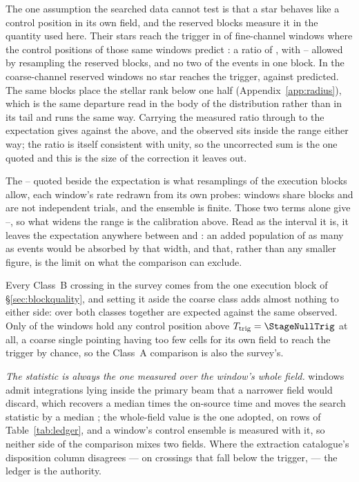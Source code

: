 The one assumption the searched data cannot test is that a star behaves like
a control position in its own field, and the reserved blocks measure it in
the quantity used here. Their stars reach the trigger in \StHoObs{} of
\StHoNFine{} fine-channel windows where the control positions of those same
windows predict \StHoExpFine: a ratio of \StHoRatio, with \StHoLo--\StHoHi{}
allowed by resampling the reserved blocks, and no two of the events in one
block. In the \StHoNCoarse{} coarse-channel reserved windows no star reaches
the trigger, against \StHoExpCoarse{} predicted. The same blocks place the
stellar rank below one half (Appendix~\ref{app:radius}), which is the same
departure read in the body of the distribution rather than in its tail and
runs the same way. Carrying the measured ratio through to the expectation
gives \CeExpX{} against the \CeExp{} above, and the observed \CeObs{} sits
inside the range either way; the ratio is itself consistent with unity, so
the uncorrected sum is the one quoted and this is the size of the correction
it leaves out.

The \CeLo--\CeHi{} quoted beside the expectation is what \CeNBoot{}
resamplings of the execution blocks allow, each window's rate redrawn from
its own \NCtrl{} probes: windows share blocks and are not independent
trials, and the ensemble is finite. Those two terms alone give
\CeLoNull--\CeHiNull, so what widens the range is the calibration above.
Read as the interval it is, it leaves the expectation anywhere between
\CeLo{} and \CeHi: an added population of as many as \CeAddBlind{} events
would be absorbed by that width, and that, rather than any smaller figure,
is the limit on what the comparison can exclude.

Every Class~B crossing in the survey comes from the one execution block of
\S\ref{sec:blockquality}, and setting it aside the coarse class adds almost
nothing to either side: over both classes together \CeExpSurv{} are expected
against the same \CeObs{} observed. Only \NCtrlWinObs{} of the \NWindows{}
windows hold any control position above $T_{\rm trig}=\StageNullTrig$ at
all, a coarse single pointing having too few cells for its own field to
reach the trigger by chance, so the Class~A comparison is also the survey's.

\emph{The statistic is always the one measured over the window's whole field.}
\StNRep{} windows admit integrations lying inside the primary beam that a
narrower field would discard, which recovers a median \StRepOnsrc{} times the
on-source time and moves the search statistic by a median \StRepDT; the
whole-field value is the one adopted, on \StRepAdopted{} rows of
Table~\ref{tab:ledger}, and a window's control ensemble is measured with it,
so neither side of the comparison mixes two fields. Where the extraction
catalogue's disposition column disagrees --- on \StRepFell{} crossings that
fall below the trigger, \StRepAttrClause{} --- the ledger is the authority.

